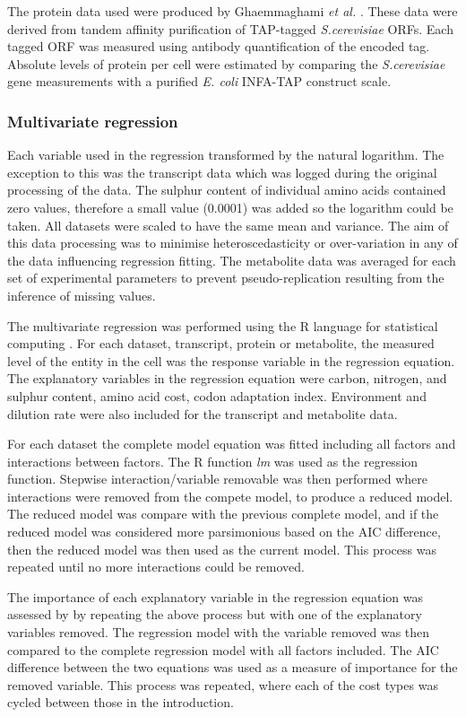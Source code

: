 The protein data used were produced by Ghaemmaghami \emph{et al.} \cite{ghaemmaghami2003}. These data were derived from tandem affinity purification of TAP-tagged \emph{S.cerevisiae} ORFs. Each tagged ORF was measured using antibody quantification of the encoded tag. Absolute levels of protein per cell were estimated by comparing the \emph{S.cerevisiae} gene measurements with a purified \emph{E. coli} INFA-TAP construct scale.

\subsubsection{Multivariate regression}

Each variable used in the regression transformed by the natural logarithm.  The exception to this was the transcript data which was logged during the original processing of the data. The sulphur content of individual amino acids contained zero values, therefore a small value (0.0001) was added so the logarithm could be taken. All datasets were scaled to have the same mean and variance. The aim of this data processing was to minimise heteroscedasticity or over-variation in any of the data influencing regression fitting. The metabolite data was averaged for each set of experimental parameters to prevent pseudo-replication resulting from the inference of missing values.

The multivariate regression was performed using the R language for statistical computing \cite{R}. For each dataset, transcript, protein or metabolite, the measured level of the entity in the cell was the response variable in the regression equation. The explanatory variables in the regression equation were carbon, nitrogen, and sulphur content, amino acid cost, codon adaptation index. Environment and dilution rate were also included for the transcript and metabolite data.

For each dataset the complete model equation was fitted including all factors and interactions between factors. The R function \emph{lm} was used as the regression function. Stepwise interaction/variable removable was then performed where interactions were removed from the compete model, to produce a reduced model. The reduced model was compare with the previous complete model, and if the reduced model was considered more parsimonious based on the AIC difference, then the reduced model was then used as the current model. This process was repeated until no more interactions could be removed.

The importance of each explanatory variable in the regression equation was assessed by by repeating the above process but with one of the explanatory variables removed. The regression model with the variable removed was then compared to the complete regression model with all factors included. The AIC difference between the two equations was used as a measure of importance for the removed variable. This process was repeated, where each of the cost types was cycled between those in the introduction.
